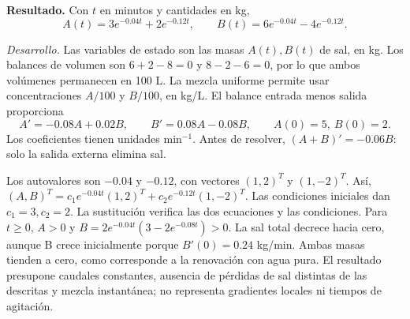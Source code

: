 \noindent\textbf{Resultado.} Con \(t\) en minutos y cantidades en kg,
\[A(t)=3e^{-0.04t}+2e^{-0.12t},\qquad B(t)=6e^{-0.04t}-4e^{-0.12t}.\]

\noindent\textit{Desarrollo.} Las variables de estado son las masas \(A(t),B(t)\) de sal, en kg. Los balances
de volumen son \(6+2-8=0\) y \(8-2-6=0\), por lo que ambos volúmenes permanecen en 100 L.
La mezcla uniforme permite usar concentraciones \(A/100\) y \(B/100\), en kg/L.
El balance entrada menos salida proporciona
\[A'=-0.08A+0.02B,\qquad B'=0.08A-0.08B,\qquad A(0)=5,\ B(0)=2.\]
Los coeficientes tienen unidades min\(^{-1}\). Antes de resolver,
\((A+B)'=-0.06B\): solo la salida externa elimina sal.

Los autovalores son \(-0.04\) y \(-0.12\), con vectores \((1,2)^T\) y \((1,-2)^T\).
Así, \((A,B)^T=c_1e^{-0.04t}(1,2)^T+c_2e^{-0.12t}(1,-2)^T\).
Las condiciones iniciales dan \(c_1=3,c_2=2\).
La sustitución verifica las dos ecuaciones y las condiciones.
Para \(t\ge0\), \(A>0\) y \(B=2e^{-0.04t}(3-2e^{-0.08t})>0\).
La sal total decrece hacia cero, aunque B crece inicialmente porque \(B'(0)=0.24\) kg/min.
Ambas masas tienden a cero, como corresponde a la renovación con agua pura.
El resultado presupone caudales constantes, ausencia de pérdidas de sal distintas de las descritas
y mezcla instantánea; no representa gradientes locales ni tiempos de agitación.
